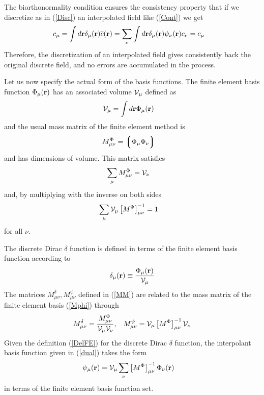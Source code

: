 \documentclass[b5paper,openright,10pt]{book}
\newcommand{\llg}{\left\lgroup}
\newcommand{\rlg}{\right\rgroup}
\begin{document}
The biorthonormality  condition ensures the consistency  property that
if  we  discretize  as  in (\ref{Disc})  an  interpolated  field  like
(\ref{Cont}) we get
\begin{align}
  c_\mu&=\int d{\bf r}\delta_\mu({\bf r})\overline{c}({\bf r})
=\sum_\nu\int d{\bf r}\delta_\mu({\bf r})\psi_\nu({\bf r})c_\nu=c_\mu
\end{align}
Therefore,  the   discretization  of   an  interpolated   field  gives
consistently back the original discrete field, and no errors are accumulated in the process.

Let us now specify the actual form of the basis functions.  The finite
element basis  function $\Phi_\mu({\bf  r})$ has an  associated volume
${\cal V}_\mu$ defined as
\begin{align}
  {\cal V}_{\mu}&=\int d{\bf r}\Phi_\mu({\bf r})
\end{align}
and the usual mass matrix of the finite element method is 
\begin{align}
M^\Phi_{\mu\nu}&=\llg\Phi_\mu\Phi_\nu\rlg  
\label{Mphi}
\end{align}
 and has dimensions of volume. This matrix satisfies 
\begin{align}
\sum_\mu M^\Phi_{\mu\nu} &={\cal V}_\nu
\end{align}
and, by multiplying with the inverse on both sides
\begin{align}
  \sum_\mu {\cal V}_\mu \left[M^{\Phi}\right]^{-1}_{\mu\nu}&=1
\label{sumM}
\end{align}
for all $\nu$.

The discrete  Dirac $\delta$ function is  defined in terms of  the finite
element basis function according to
\begin{align}
  \delta_\mu({\bf r})\equiv\frac{\Phi_\mu({\bf r})}{{\cal V}_\mu}
\label{DelFE}
\end{align}
The matrices $M^\delta_{\mu\nu}, M^\psi_{\mu\nu}$ defined in (\ref{MM}) are related to
the mass matrix of the finite element basis (\ref{Mphi}) through
\begin{align}
    M^\delta_{\mu\nu}=\frac{  M^\Phi_{\mu\nu}}{{\cal V}_\mu{\cal V}_\nu}, &&
M^\psi_{\mu\nu}={\cal V}_\mu \left[M^{\Phi}\right]^{-1}_{\mu\nu}{\cal V}_\nu
\label{MdMp}
\end{align}
Given the definition (\ref{DelFE}) for the discrete Dirac $\delta$ function,  the interpolant basis function given in (\ref{dual}) takes the form
\begin{align}
  \psi_\mu({\bf r})&
  ={\cal V}_\mu \sum_\nu \left[M^{\Phi}\right]^{-1}_{\mu\nu} \Phi_\nu({\bf r})
\label{PsiFE}
\end{align}
in terms of the finite element basis function set.
\end{document}
